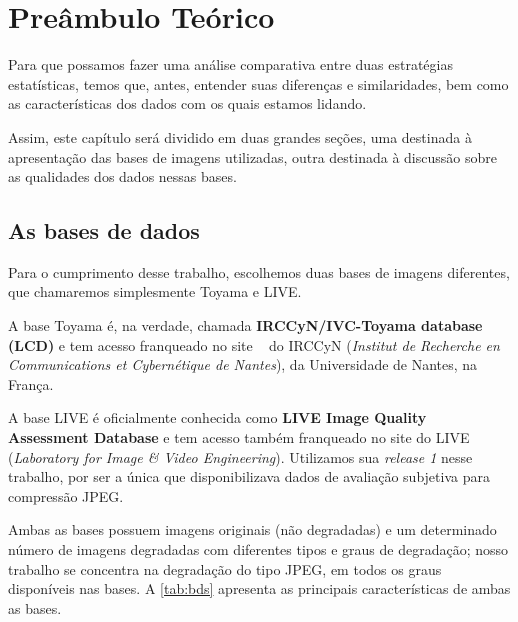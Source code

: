 \chapter{Preâmbulo Teórico}

Para que possamos fazer uma análise comparativa entre duas estratégias estatísticas, temos que, antes, entender suas diferenças e similaridades, bem como as características dos dados com os quais estamos lidando.

Assim, este capítulo será dividido em duas grandes seções, uma destinada à apresentação das bases de imagens utilizadas, outra destinada à discussão sobre as qualidades dos dados nessas bases.

\section{As bases de dados}\label{sec:imdb}

Para o cumprimento desse trabalho, escolhemos duas bases de imagens diferentes, que chamaremos simplesmente Toyama e LIVE.

A base Toyama é, na verdade, chamada \textbf{IRCCyN/IVC-Toyama database (LCD)} e tem acesso franqueado no site ~\cite{Tourancheau2008} do IRCCyN (\emph{Institut de Recherche en Communications et Cybernétique de Nantes}), da Universidade de Nantes, na França.

A base LIVE é oficialmente conhecida como \textbf{LIVE Image Quality Assessment Database} e tem acesso também franqueado no site \cite{livedb} do LIVE (\emph{Laboratory for Image \& Video Engineering}). Utilizamos sua \emph{release 1} nesse trabalho, por ser a única que disponibilizava dados de avaliação subjetiva para compressão JPEG.

Ambas as bases possuem imagens originais (não degradadas) e um determinado número de imagens degradadas com diferentes tipos e graus de degradação; nosso trabalho se concentra na degradação do tipo JPEG, em todos os graus disponíveis nas bases. A \autoref{tab:bds} apresenta as principais características de ambas as bases. 

